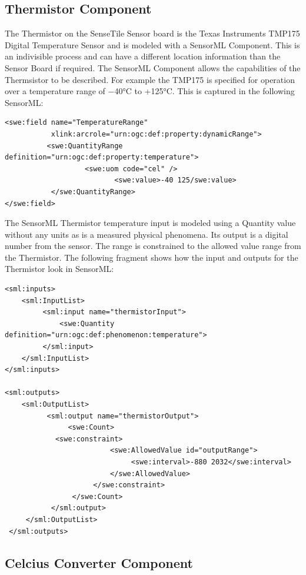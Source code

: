 \documentclass[]{final_report}
\begin{document}
\subsection{Thermistor Component}
The Thermistor on the SenseTile Sensor board is the Texas Instruments TMP175 Digital Temperature Sensor and is modeled with a SensorML Component. This is an indivisible process and can have a different location information than the Sensor Board if required. The SensorML Component allows the capabilities of the Thermsistor to be described. For example the TMP175 is  specified for operation over a temperature range of −40°C to +125°C. This is captured in the following SensorML:

\begin{lstlisting}
<swe:field name="TemperatureRange" 
           xlink:arcrole="urn:ogc:def:property:dynamicRange">
          <swe:QuantityRange definition="urn:ogc:def:property:temperature">
                   <swe:uom code="cel" /> 
                          <swe:value>-40 125/swe:value> 
           </swe:QuantityRange>
</swe:field>
\end{lstlisting}

The SensorML Thermistor temperature input is modeled using a Quantity value without any units as is a measured physical phenomena. Its output is a digital number from the sensor. The range is constrained to the allowed value range from the Thermistor. The following fragment shows how the input and outputs for the Thermistor look in SensorML:

\begin{lstlisting}
<sml:inputs>
    <sml:InputList>
         <sml:input name="thermistorInput">
             <swe:Quantity definition="urn:ogc:def:phenomenon:temperature">
         </sml:input>
    </sml:InputList>
</sml:inputs>

<sml:outputs>
    <sml:OutputList>
          <sml:output name="thermistorOutput">
               <swe:Count>
	        <swe:constraint>
                         <swe:AllowedValue id="outputRange">
                              <swe:interval>-880 2032</swe:interval>
                         </swe:AllowedValue>
                     </swe:constraint>
                </swe:Count>
           </sml:output>
     </sml:OutputList>
 </sml:outputs>
\end{lstlisting}


\subsection{Celcius Converter Component}
\end{document}

